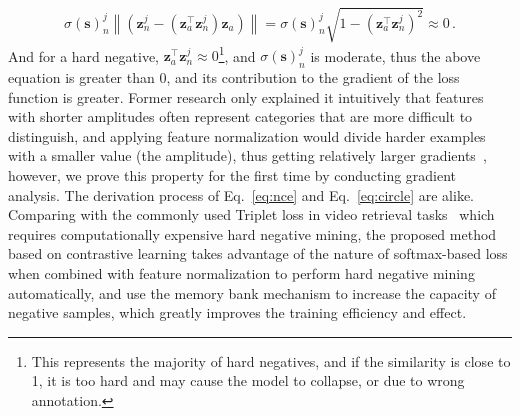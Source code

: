 \documentclass[10pt,twocolumn,letterpaper]{article}
\begin{document}
{\small
\begin{equation} \label{eq:gradcontrib}
    \sigma(\mathbf{s})_{n}^{j} \left\| \left(\mathbf{z}_{n}^{j} -\left(\mathbf{z}_{a}^{\top}\mathbf{z}_{n}^{j}\right)\mathbf{z}_{a} \right) \right\| = \sigma(\mathbf{s})_{n}^{j} \sqrt{1 - \left( \mathbf{z}_{a}^{\top}\mathbf{z}_{n}^{j} \right)^2} \approx 0 \,.
\end{equation}
}
And for a hard negative, $\mathbf{z}_{a}^{\top}\mathbf{z}_{n}^{j} \approx 0$\footnote{This represents the majority of hard negatives, and if the similarity is close to 1, it is too hard and may cause the model to collapse, or due to wrong annotation.}, and $\sigma(\mathbf{s})_{n}^{j}$ is moderate, thus the above equation is greater than 0, and its contribution to the gradient of the loss function is greater. Former research only explained it intuitively that features with shorter amplitudes often represent categories that are more difficult to distinguish, and applying feature normalization would divide harder examples with a smaller value (the amplitude), thus getting relatively larger gradients~\cite{feng2018research}, however, we prove this property for the first time by conducting gradient analysis. The derivation process of Eq.~\ref{eq:nce} and Eq.~\ref{eq:circle} are alike. Comparing with the commonly used Triplet loss in video retrieval tasks~\cite{kordopatis2017dml,kordopatis2019visil} which requires computationally expensive hard negative mining, the proposed method based on contrastive learning takes advantage of the nature of softmax-based loss when combined with feature normalization to perform hard negative mining automatically, and use the memory bank mechanism to increase the capacity of negative samples, which greatly improves the training efficiency and effect.
\end{document}
